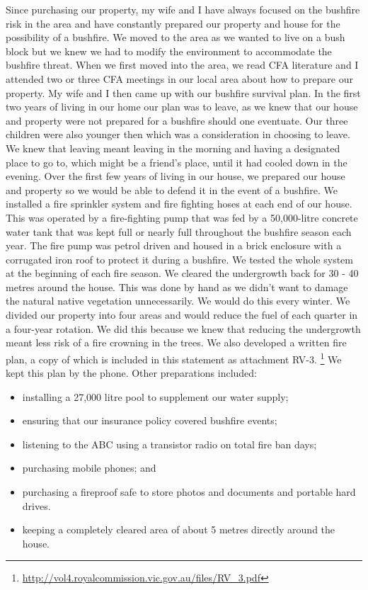 \documentclass[a4paper]{article}
\begin{document}
        Since purchasing our property, my wife and I have always focused on the bushfire risk in the area and have constantly prepared our property and house for the possibility of a bushfire. We moved to the area as we wanted to live on a bush block but we knew we had to modify the environment to accommodate the bushfire threat.
        When we first moved into the area, we read CFA literature and I attended two or three CFA meetings in our local area about how to prepare our property.
        My wife and I then came up with our bushfire survival plan. In the first two years of living in our home our plan was to leave, as we knew that our house and property were not prepared for a bushfire should one eventuate. Our three children were also younger then which was a consideration in choosing to leave. We knew that leaving meant leaving in the morning and having a designated place to go to, which might be a friend's place, until it had cooled down in the evening.
        Over the first few years of living in our house, we prepared our house and property so we would be able to defend it in the event of a bushfire.
        We installed a fire sprinkler system and fire fighting hoses at each end of our house. This was operated by a fire-fighting pump that was fed by a 50,000-litre concrete water tank that was kept full or nearly full throughout the bushfire season each year. The fire pump was petrol driven and housed in a brick enclosure with a corrugated iron roof to protect it during a bushfire. We tested the whole system at the beginning of each fire season.
        We cleared the undergrowth back for 30 - 40 metres around the house. This was done by hand as we didn't want to damage the natural native vegetation unnecessarily. We would do this every winter. We divided our property into four areas and would reduce the fuel of each quarter in a four-year rotation. We did this because we knew that reducing the undergrowth meant less risk of a fire crowning in the trees.
        We also developed a written fire plan, a copy of which is included in this statement as attachment RV-3.
        \footnote{\url{http://vol4.royalcommission.vic.gov.au/files/RV_3.pdf}}
         We kept this plan by the phone.
        Other preparations included:
        \begin{itemize}
            \item installing a 27,000 litre pool to supplement our water supply;
            \item ensuring that our insurance policy covered bushfire events;
            \item listening to the ABC using a transistor radio on total fire ban days;
            \item purchasing mobile phones; and
            \item purchasing a fireproof safe to store photos and documents and portable hard drives.
            \item keeping a completely cleared area of about 5 metres directly around the house.
        \end{itemize}
\end{document}
